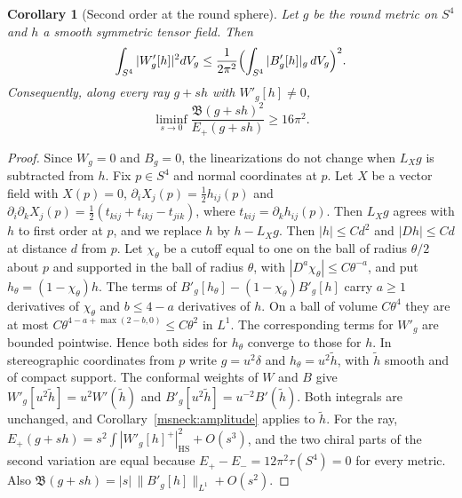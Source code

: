 \documentclass[11pt]{article}
\numberwithin{equation}{section}
\newtheorem{corollary}[theorem]{Corollary}
\theoremstyle{definition}
\theoremstyle{remark}
\newcommand{\HS}{\mathrm{HS}}
\begin{document}
\begin{corollary}[Second order at the round sphere]\label{msneck:round}
Let \(g\) be the round metric on \(S^4\) and \(h\) a smooth symmetric
tensor field. Then
\[
 \int_{S^4}|W'_g[h]|^2dV_g\le\frac1{2\pi^2}
 \Bigl(\int_{S^4}|B'_g[h]|_g\,dV_g\Bigr)^2 .
\]
Consequently, along every ray \(g+sh\) with \(W'_g[h]\ne0\),
\[
 \liminf_{s\to0}\frac{\mathfrak B(g+sh)^2}{E_+(g+sh)}\ge16\pi^2 .
\]
\end{corollary}

\begin{proof}
Since \(W_g=0\) and \(B_g=0\), the linearizations do not change when
\(L_Xg\) is subtracted from \(h\). Fix \(p\in S^4\) and normal coordinates
at \(p\). Let \(X\) be a vector field with \(X(p)=0\), \(\partial_iX_j(p)=\tfrac12h_{ij}(p)\) and
\(\partial_i\partial_kX_j(p)=\tfrac12(t_{kij}+t_{ikj}-t_{jik})\), where
\(t_{kij}=\partial_kh_{ij}(p)\). Then \(L_Xg\) agrees with \(h\) to first order at \(p\), and we replace \(h\) by \(h-L_Xg\). Then
\(|h|\le Cd^2\) and \(|Dh|\le Cd\) at distance \(d\) from \(p\). Let
\(\chi_\theta\) be a cutoff equal to one on the ball of radius \(\theta/2\)
about \(p\) and supported in the ball of radius \(\theta\), with
\(|D^a\chi_\theta|\le C\theta^{-a}\), and put \(h_\theta=(1-\chi_\theta)h\). The
terms of \(B'_g[h_\theta]-(1-\chi_\theta)B'_g[h]\) carry \(a\ge1\) derivatives
of \(\chi_\theta\) and \(b\le4-a\) derivatives of \(h\). On a ball of volume
\(C\theta^4\) they are at most \(C\theta^{4-a+\max(2-b,0)}\le C\theta^2\) in
\(L^1\). The corresponding terms for \(W'_g\) are bounded pointwise. Hence
both sides for \(h_\theta\) converge to those for \(h\). In stereographic
coordinates from \(p\) write \(g=u^2\delta\) and \(h_\theta=u^2\tilde h\), with
\(\tilde h\) smooth and of compact support. The conformal weights of \(W\)
and \(B\) give \(W'_g[u^2\tilde h]=u^2W'(\tilde h)\) and
\(B'_g[u^2\tilde h]=u^{-2}B'(\tilde h)\). Both integrals are unchanged, and
Corollary~\ref{msneck:amplitude} applies to \(\tilde h\). For the ray,
\(E_+(g+sh)=s^2\int|W'_g[h]^+|_{\HS}^2+O(s^3)\), and the two chiral parts
of the second variation are equal because \(E_+-E_-=12\pi^2\tau(S^4)=0\) for
every metric. Also \(\mathfrak B(g+sh)=|s|\,\|B'_g[h]\|_{L^1}+O(s^2)\).
\end{proof}
\end{document}
